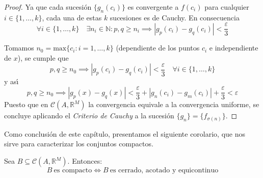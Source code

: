 \begin{proof}
    Ya que cada sucesi\'on $\{ g_n(c_i)\}$ es convergente a $f(c_i)$
    para cualquier $i \in \{ 1,\dots ,k\}$, cada una de estas $k$
    sucesiones es de Cauchy. En consecuencia
    \[\forall i \in \{ 1,\dots ,k\} \quad \exists n_i \in \mathbb{N} :
    p,q \geq n_i \implies |g_p(c_i) - g_q(c_i)| <
    \frac{\varepsilon}{3}\]

  Tomamos $n_0 = \text{max}\{c_i: i = 1,\ldots, k\}$ ({dependiente de
    los puntos $c_i$ e independiente de $x$}), se cumple que
    \[
      p,q \geq n_0 \implies |g_p(c_i)-g_q(c_i)| <\frac{\varepsilon}{3}
      \quad \forall i\in \{ 1,\dots ,k\}
    \]
    y as\'{\i}
    \[
      p,q \geq n_0 \implies |g_p(x)-g_q(x)| <\frac{\varepsilon}{3}
      +|g_n(c_i)-g_m(c_i)| + \frac{\varepsilon}{3} <\varepsilon
    \]
    Puesto que en $\mathcal{C}(A,\mathbb R^M )$ la convergencia
    equivale a la convergencia uniforme, se concluye aplicando el
    \textit{Criterio de Cauchy} a la sucesión
    $\{g_n\} = \{f_{\sigma(n)}\}$.
  \end{proof}

Como conclusión de este capítulo, presentamos el siguiente corolario, que nos sirve para caracterizar los conjuntos compactos.

\begin{ncor} Sea $B \subseteq \mathcal{C}(A,\mathbb{R}^M)$. Entonces: $$B\ \text{es compacto} \iff B \ \text{es cerrado, acotado y equicontinuo}$$
\end{ncor}

